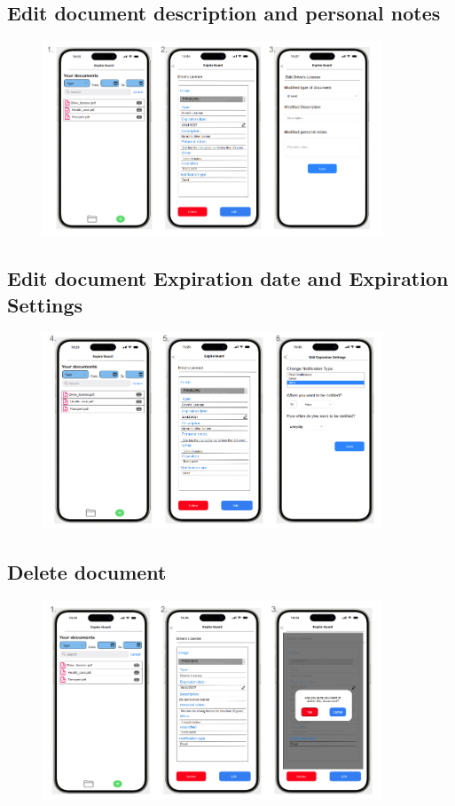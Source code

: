 	\subsection{Edit document description and personal notes}
		
		\begin{figure}[htbp]
			\centering
			\includegraphics[width=0.9\textwidth]{../mockups/edit_doc_meta_1.png}  %
		\end{figure}
		\clearpage
	\subsection{Edit document Expiration date and Expiration Settings}

		\begin{figure}[htbp]
			\centering
			\includegraphics[width=0.9\textwidth]{../mockups/edit_doc_expr_1.png}  %
		\end{figure}
		\clearpage
	\subsection{Delete document}

		\begin{figure}[htbp]
			\centering
			\includegraphics[width=0.9\textwidth]{../mockups/delete_doc.png}  %
		\end{figure}
		\clearpage
		
